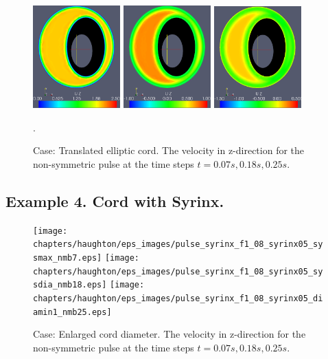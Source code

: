 \begin{figure}\begin{center}
\includegraphics[width=0.3\textwidth]{chapters/haughton/eps_images/pulse_f1_08_elliptic_eccentric_sysmax_nmb7.eps}
\includegraphics[width=0.3\textwidth]{chapters/haughton/eps_images/pulse_f1_08_elliptic_eccentric_sysdia_nmb18.eps}
\includegraphics[width=0.3\textwidth]{chapters/haughton/eps_images/pulse_f1_08_elliptic_eccentric_diamin1_nmb25.eps}
\caption{Case: Translated elliptic cord. The velocity in z-direction for the non-symmetric pulse at the time steps $t=0.07s, 0.18s, 0.25s$.}
\label{fig:case3b}. 
\end{center}\end{figure}


\subsection{Example 4. Cord with Syrinx.} 
\begin{figure}\begin{center}
\texttt{[image: chapters/haughton/eps\_images/pulse\_syrinx\_f1\_08\_syrinx05\_sysmax\_nmb7.eps]}
\texttt{[image: chapters/haughton/eps\_images/pulse\_syrinx\_f1\_08\_syrinx05\_sysdia\_nmb18.eps]}
\texttt{[image: chapters/haughton/eps\_images/pulse\_syrinx\_f1\_08\_syrinx05\_diamin1\_nmb25.eps]}
\caption{Case: Enlarged cord diameter. The velocity in z-direction for the non-symmetric pulse at the time steps $t=0.07s, 0.18s, 0.25s$.}
\label{fig:case4}
\end{center}\end{figure}

